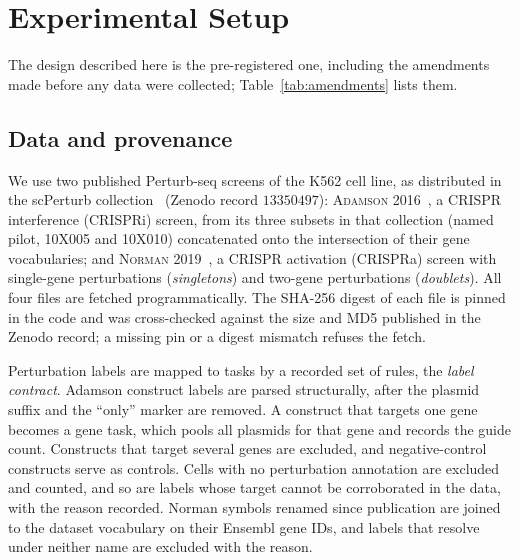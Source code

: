 
\section{Experimental Setup}\label{sec:setup_exp}

The design described here is the pre-registered one, including the amendments made before any
data were collected; Table~\ref{tab:amendments} lists them.

\subsection{Data and provenance}\label{subsec:datasets}

We use two published Perturb-seq screens of the K562 cell line, as distributed
in the scPerturb collection~\citep{peidli2024scperturb} (Zenodo record $13350497$):
\textsc{Adamson 2016}~\citep{adamson2016perturbseq}, a CRISPR interference
(CRISPRi) screen, from its three subsets in that collection (named pilot, 10X005
and 10X010) concatenated onto the intersection of their gene vocabularies; and
\textsc{Norman 2019}~\citep{norman2019perturbseq}, a CRISPR activation (CRISPRa)
screen with single-gene perturbations (\emph{singletons}) and two-gene
perturbations (\emph{doublets}). All four files are fetched
programmatically. The SHA-256 digest of each file is pinned in the code and was
cross-checked against the size and MD5 published in the Zenodo record; a missing
pin or a digest mismatch refuses the fetch.

Perturbation labels are mapped to tasks by a recorded set of rules, the
\emph{label contract}. Adamson construct labels are
parsed structurally, after the plasmid suffix and the ``only'' marker are removed. A
construct that targets one gene becomes a gene task, which pools all plasmids for that gene
and records the guide count. Constructs that target several genes are excluded, and
negative-control constructs serve as controls. Cells with no perturbation annotation are
excluded and counted, and so are labels whose target cannot be corroborated in the data, with
the reason recorded. Norman symbols renamed since publication are joined to the dataset vocabulary on
their Ensembl gene IDs, and labels that resolve under neither name are excluded with the
reason.


